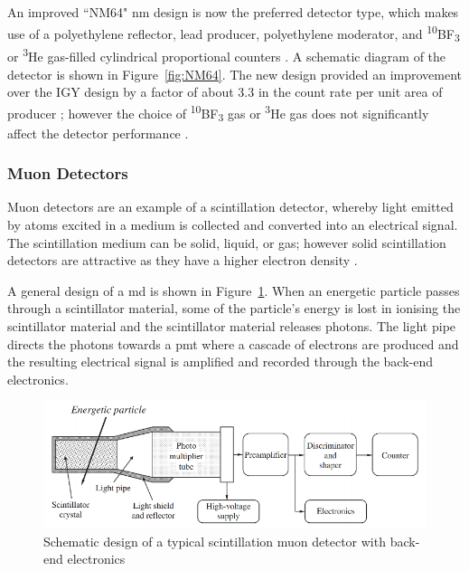 An improved ``NM64" \gls{nm} design is now the preferred detector type, which makes use of a polyethylene reflector, lead producer, polyethylene moderator, and \textsuperscript{10}BF\textsubscript{3} or \textsuperscript{3}He gas-filled cylindrical proportional counters \citep{kang_characteristics_2012}. A schematic diagram of the detector is shown in Figure~\ref{fig:NM64}. The new design provided an improvement over the IGY design by a factor of about 3.3 in the count rate per unit area of producer \citep{stoker_neutron_2000}; however the choice of \textsuperscript{10}BF\textsubscript{3} gas or \textsuperscript{3}He gas does not significantly affect the detector performance \citep{kang_characteristics_2012}.



\subsubsection*{Muon Detectors}

Muon detectors are an example of a scintillation detector, whereby light emitted by atoms excited in a medium is collected and converted into an electrical signal. The scintillation medium can be solid, liquid, or gas; however solid scintillation detectors are attractive as they have a higher electron density \citep{gloeckler_-situ_2010}.

A general design of a \gls{md} is shown in Figure~\ref{fig:MD}. When an energetic particle passes through a scintillator material, some of the particle's energy is lost in ionising the scintillator material and the scintillator material releases photons. The light pipe directs the photons towards a \gls{pmt} where a cascade of electrons are produced and the resulting electrical signal is amplified and recorded through the back-end electronics.

\begin{figure}[ht]
	\centering
	\includegraphics[width=0.7\columnwidth]{scintillator_rescaled.png}
	\caption{Schematic design of a typical scintillation muon detector with back-end electronics \citep{gloeckler_-situ_2010}}
	\label{fig:MD}
\end{figure}

